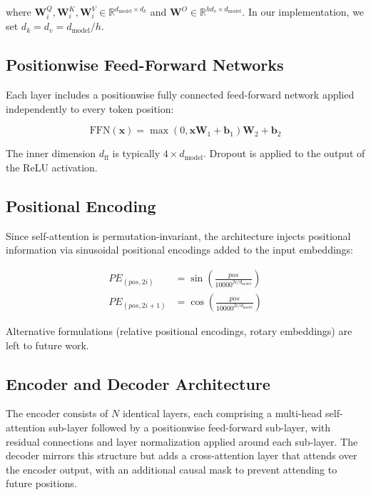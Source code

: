 where $\mathbf{W}_i^Q, \mathbf{W}_i^K, \mathbf{W}_i^V \in \mathbb{R}^{d_{\text{model}} \times d_k}$ and $\mathbf{W}^O \in \mathbb{R}^{h d_v \times d_{\text{model}}}$. In our implementation, we set $d_k = d_v = d_{\text{model}} / h$.

\subsection{Positionwise Feed-Forward Networks}

Each layer includes a positionwise fully connected feed-forward network applied independently to every token position:

\begin{equation}
\text{FFN}(\mathbf{x}) = \max(0, \mathbf{x} \mathbf{W}_1 + \mathbf{b}_1) \mathbf{W}_2 + \mathbf{b}_2
\end{equation}

The inner dimension $d_{\text{ff}}$ is typically $4 \times d_{\text{model}}$. Dropout is applied to the output of the ReLU activation.

\subsection{Positional Encoding}

Since self-attention is permutation-invariant, the architecture injects positional information via sinusoidal positional encodings added to the input embeddings:

\begin{equation}
\begin{aligned}
PE_{(pos, 2i)} &= \sin\!\left(\frac{pos}{10000^{2i / d_{\text{model}}}}\right) \\
PE_{(pos, 2i+1)} &= \cos\!\left(\frac{pos}{10000^{2i / d_{\text{model}}}}\right)
\end{aligned}
\end{equation}

Alternative formulations (relative positional encodings, rotary embeddings) are left to future work.

\subsection{Encoder and Decoder Architecture}

The encoder consists of $N$ identical layers, each comprising a multi-head self-attention sub-layer followed by a positionwise feed-forward sub-layer, with residual connections and layer normalization applied around each sub-layer. The decoder mirrors this structure but adds a cross-attention layer that attends over the encoder output, with an additional causal mask to prevent attending to future positions.

